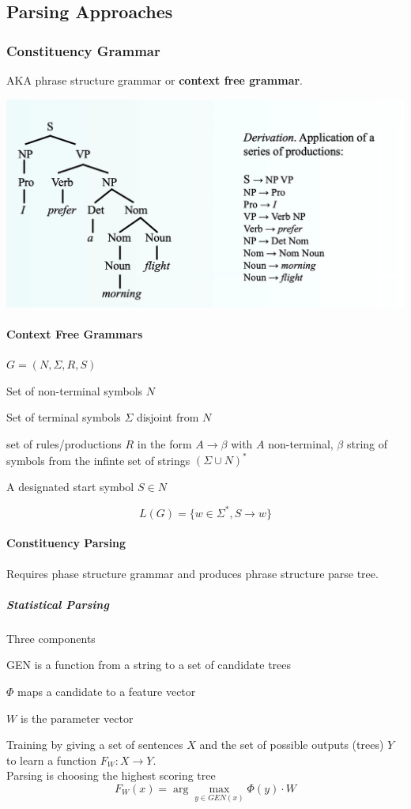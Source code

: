 \documentclass[10pt]{report}
\begin{document}
\subsection{Parsing Approaches}
\subsubsection{Constituency Grammar}
AKA phrase structure grammar or \textbf{context free grammar}.
\begin{center}
	\includegraphics[scale=0.5]{36.png}
\end{center}
\paragraph{Context Free Grammars} $G = (N,\Sigma, R, S)$
\begin{list}{}{}
	\item Set of non-terminal symbols $N$
	\item Set of terminal symbols $\Sigma$ disjoint from $N$
	\item set of rules/productions $R$ in the form $A\rightarrow\beta$ with $A$ non-terminal, $\beta$ string of symbols from the infinte set of strings $(\Sigma\cup N)^*$
	\item A designated start symbol $S \in N$
\end{list}
$$L(G) = \{w\in \Sigma^*, S\rightarrow w\}$$
\paragraph{Constituency Parsing} Requires phase structure grammar and produces phrase structure parse tree.
\subparagraph{Statistical Parsing} Three components \begin{list}{}{}
	\item GEN is a function from a string to a set of candidate trees
	\item $\Phi$ maps a candidate to a feature vector
	\item $W$ is the parameter vector
\end{list}
Training by giving a set of sentences $X$ and the set of possible outputs (trees) $Y$ to learn a function $F_W:X\rightarrow Y$.\\
Parsing is choosing the highest scoring tree $$F_W(x)=\arg\max_{y\in GEN(x)}\Phi(y)\cdot W$$
\end{document}
